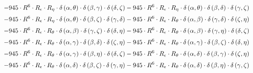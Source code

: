 \begin{subequations}
\begin{gather}
 \\[0.2em] \notag 		 - 945 \cdot R^{6} \cdot R_{\epsilon{}} \cdot R_{\eta{}} \cdot \delta{}\left(\alpha{}, \theta{}\right) \cdot \delta{}\left(\beta{}, \gamma{}\right) \cdot \delta{}\left(\delta{}, \zeta{}\right)- 945 \cdot R^{6} \cdot R_{\epsilon{}} \cdot R_{\eta{}} \cdot \delta{}\left(\alpha{}, \theta{}\right) \cdot \delta{}\left(\beta{}, \delta{}\right) \cdot \delta{}\left(\gamma{}, \zeta{}\right) 
 \\[0.2em] \notag 		 - 945 \cdot R^{6} \cdot R_{\epsilon{}} \cdot R_{\eta{}} \cdot \delta{}\left(\alpha{}, \theta{}\right) \cdot \delta{}\left(\beta{}, \zeta{}\right) \cdot \delta{}\left(\gamma{}, \delta{}\right)- 945 \cdot R^{6} \cdot R_{\epsilon{}} \cdot R_{\theta{}} \cdot \delta{}\left(\alpha{}, \beta{}\right) \cdot \delta{}\left(\gamma{}, \delta{}\right) \cdot \delta{}\left(\zeta{}, \eta{}\right) 
 \\[0.2em] \notag 		 - 945 \cdot R^{6} \cdot R_{\epsilon{}} \cdot R_{\theta{}} \cdot \delta{}\left(\alpha{}, \beta{}\right) \cdot \delta{}\left(\gamma{}, \zeta{}\right) \cdot \delta{}\left(\delta{}, \eta{}\right)- 945 \cdot R^{6} \cdot R_{\epsilon{}} \cdot R_{\theta{}} \cdot \delta{}\left(\alpha{}, \beta{}\right) \cdot \delta{}\left(\gamma{}, \eta{}\right) \cdot \delta{}\left(\delta{}, \zeta{}\right) 
 \\[0.2em] \notag 		 - 945 \cdot R^{6} \cdot R_{\epsilon{}} \cdot R_{\theta{}} \cdot \delta{}\left(\alpha{}, \gamma{}\right) \cdot \delta{}\left(\beta{}, \delta{}\right) \cdot \delta{}\left(\zeta{}, \eta{}\right)- 945 \cdot R^{6} \cdot R_{\epsilon{}} \cdot R_{\theta{}} \cdot \delta{}\left(\alpha{}, \gamma{}\right) \cdot \delta{}\left(\beta{}, \zeta{}\right) \cdot \delta{}\left(\delta{}, \eta{}\right) 
 \\[0.2em] \notag 		 - 945 \cdot R^{6} \cdot R_{\epsilon{}} \cdot R_{\theta{}} \cdot \delta{}\left(\alpha{}, \gamma{}\right) \cdot \delta{}\left(\beta{}, \eta{}\right) \cdot \delta{}\left(\delta{}, \zeta{}\right)- 945 \cdot R^{6} \cdot R_{\epsilon{}} \cdot R_{\theta{}} \cdot \delta{}\left(\alpha{}, \delta{}\right) \cdot \delta{}\left(\beta{}, \gamma{}\right) \cdot \delta{}\left(\zeta{}, \eta{}\right) 
 \\[0.2em] \notag 		 - 945 \cdot R^{6} \cdot R_{\epsilon{}} \cdot R_{\theta{}} \cdot \delta{}\left(\alpha{}, \delta{}\right) \cdot \delta{}\left(\beta{}, \zeta{}\right) \cdot \delta{}\left(\gamma{}, \eta{}\right)- 945 \cdot R^{6} \cdot R_{\epsilon{}} \cdot R_{\theta{}} \cdot \delta{}\left(\alpha{}, \delta{}\right) \cdot \delta{}\left(\beta{}, \eta{}\right) \cdot \delta{}\left(\gamma{}, \zeta{}\right) 

\end{gather}
\end{subequations}
